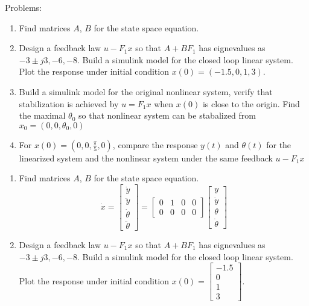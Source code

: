 {  Problems:
  \begin{enumerate}[\arabic*.]
  \item Find matrices $A$, $B$ for the state space equation.
  \item Design a feedback law $u-F_1x$  so that $A+BF_1$ has eignevalues as $-3\pm j3, -6, -8$. Build a simulink
    model for the closed loop linear system. Plot the response under initial condition
    $x(0) = (-1.5, 0, 1, 3)$.
  \item Build a simulink model for the original nonlinear system, verify that stabilization is achieved by
    $u=F_1x$ when $x(0)$ is close to the origin. Find the maximal $\theta_0$ so that nonlinear system can be
    stabalized from $x_0 = (0, 0, \theta_0,0)$
  \item For $x(0)=(0,0, \frac{\pi} 5,0)$, compare the response $y(t)$ and
    $\theta(t)$ for the linearized system and the nonlinear system under the same feedback $u - F_1x$
  \end{enumerate}
}{%
  \begin{enumerate}[\arabic*.]
  \item Find matrices $A$, $B$ for the state space equation.\\
    \begin{equation}
      \dot x =
      \begin{bmatrix}
        \dot y \\
        \ddot y \\
        \dot \theta \\
        \ddot \theta 
      \end{bmatrix} =
      \begin{bmatrix}
        0 & 1 & 0 & 0 \\
        0 & 0 & 0 & 0
      \end{bmatrix}
      \begin{bmatrix}
        y \\
        \dot y \\
        \theta \\
        \dot \theta 
      \end{bmatrix}
    \end{equation}
  \item Design a feedback law $u-F_1x$  so that $A+BF_1$ has eignevalues as $-3\pm j3, -6, -8$. Build a simulink
    model for the closed loop linear system. Plot the response under initial condition
    $x(0) = \begin{bmatrix} -1.5 \\ 0 \\ 1 \\ 3 \end{bmatrix}$.

\end{enumerate}}
